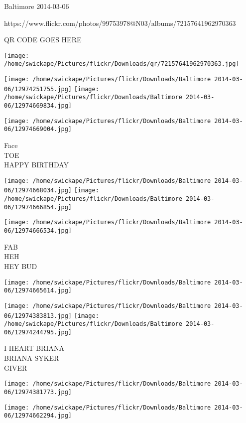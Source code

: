 \documentclass[10pt,letterpaper]{article}
\begin{document}
Baltimore 2014-03-06

https://www.flickr.com/photos/99753978@N03/albums/72157641962970363

QR CODE GOES HERE

\texttt{[image: /home/swickape/Pictures/flickr/Downloads/qr/72157641962970363.jpg]}
\pagebreak

\texttt{[image: /home/swickape/Pictures/flickr/Downloads/Baltimore 2014-03-06/12974251755.jpg]}
\texttt{[image: /home/swickape/Pictures/flickr/Downloads/Baltimore 2014-03-06/12974669834.jpg]}

\vspace{0.25in}
\texttt{[image: /home/swickape/Pictures/flickr/Downloads/Baltimore 2014-03-06/12974669004.jpg]}

Face\\
TOE\\
HAPPY BIRTHDAY\\
\pagebreak

\texttt{[image: /home/swickape/Pictures/flickr/Downloads/Baltimore 2014-03-06/12974668034.jpg]}
\texttt{[image: /home/swickape/Pictures/flickr/Downloads/Baltimore 2014-03-06/12974666854.jpg]}

\texttt{[image: /home/swickape/Pictures/flickr/Downloads/Baltimore 2014-03-06/12974666534.jpg]}

FAB\\
HEH\\
HEY BUD\\
\pagebreak

\texttt{[image: /home/swickape/Pictures/flickr/Downloads/Baltimore 2014-03-06/12974665614.jpg]}

\vspace{0.25in}
\texttt{[image: /home/swickape/Pictures/flickr/Downloads/Baltimore 2014-03-06/12974383813.jpg]}
\texttt{[image: /home/swickape/Pictures/flickr/Downloads/Baltimore 2014-03-06/12974244795.jpg]}

I HEART BRIANA\\
BRIANA SYKER\\
GIVER\\
\pagebreak

\texttt{[image: /home/swickape/Pictures/flickr/Downloads/Baltimore 2014-03-06/12974381773.jpg]}

\vspace{0.25in}
\texttt{[image: /home/swickape/Pictures/flickr/Downloads/Baltimore 2014-03-06/12974662294.jpg]}
\end{document}
